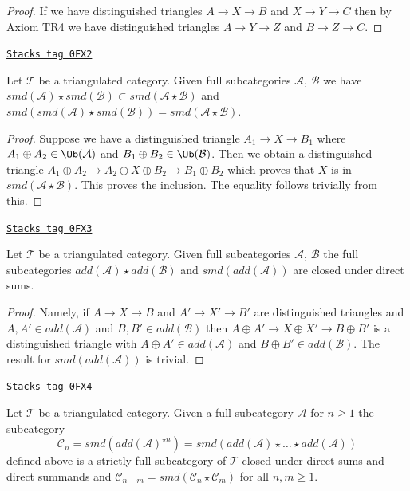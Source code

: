 \begin{proof}
If we have distinguished triangles $A \to X \to B$ and $X \to Y \to C$
then by Axiom TR4 we have distinguished triangles
$A \to Y \to Z$ and $B \to Z \to C$.
\end{proof}

\begin{lemma}
\label{derived-lemma-smd-star}
\href{https://stacks.math.columbia.edu/tag/0FX2}{\texttt{Stacks tag 0FX2}}

Let $\mathcal{T}$ be a triangulated category.
Given full subcategories $\mathcal{A}$, $\mathcal{B}$
we have
$smd(\mathcal{A}) \star smd(\mathcal{B}) \subset
smd(\mathcal{A} \star \mathcal{B})$ and
$smd(smd(\mathcal{A}) \star smd(\mathcal{B})) =
smd(\mathcal{A} \star \mathcal{B})$.
\end{lemma}

\begin{proof}
Suppose we have a distinguished triangle $A_1 \to X \to B_1$ where
$A_1 \oplus A_2 \in \Ob(\mathcal{A})$ and $B_1 \oplus B_2 \in \Ob(\mathcal{B})$.
Then we obtain a distinguished triangle
$A_1 \oplus A_2 \to A_2 \oplus X \oplus B_2 \to B_1 \oplus B_2$
which proves that $X$ is in $smd(\mathcal{A} \star \mathcal{B})$.
This proves the inclusion. The equality follows trivially from this.
\end{proof}

\begin{lemma}
\label{derived-lemma-add-star}
\href{https://stacks.math.columbia.edu/tag/0FX3}{\texttt{Stacks tag 0FX3}}

Let $\mathcal{T}$ be a triangulated category. Given full subcategories
$\mathcal{A}$, $\mathcal{B}$ the full subcategories
$add(\mathcal{A}) \star add(\mathcal{B})$ and
$smd(add(\mathcal{A}))$ are closed under direct sums.
\end{lemma}

\begin{proof}
Namely, if $A \to X \to B$ and $A' \to X' \to B'$ are distinguished triangles
and $A, A' \in add(\mathcal{A})$ and $B, B' \in add(\mathcal{B})$ then
$A \oplus A' \to X \oplus X' \to B \oplus B'$ is a distinguished triangle
with $A \oplus A' \in add(\mathcal{A})$ and $B \oplus B' \in add(\mathcal{B})$.
The result for $smd(add(\mathcal{A}))$ is trivial.
\end{proof}

\begin{lemma}[Cone n]
\label{derived-lemma-cone-n}
\href{https://stacks.math.columbia.edu/tag/0FX4}{\texttt{Stacks tag 0FX4}}

Let $\mathcal{T}$ be a triangulated category. Given a full subcategory
$\mathcal{A}$ for $n \geq 1$ the subcategory
$$
\mathcal{C}_n = smd(add(\mathcal{A})^{\star n}) =
smd(add(\mathcal{A}) \star \ldots \star add(\mathcal{A}))
$$
defined above is a strictly full subcategory of $\mathcal{T}$
closed under direct sums and direct summands and
$\mathcal{C}_{n + m} = smd(\mathcal{C}_n \star \mathcal{C}_m)$
for all $n, m \geq 1$.
\end{lemma}

